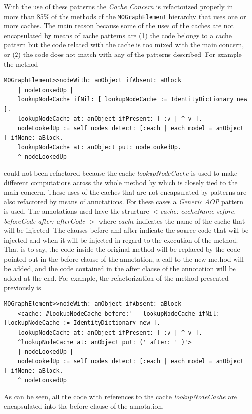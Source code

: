 \documentclass[preprint,10pt]{sigplanconf}
\newcommand{\ct}{\lstinline[backgroundcolor=\color{white},basicstyle=\footnotesize\ttfamily]}
\begin{document}
With the use of these patterns the \emph{Cache Concern} is refactorized
properly in more than 85\% of the methods of the \ct{MOGraphElement} hierarchy that uses one or more caches.
The main reason because some of the uses of the caches are not encapsulated by means of 
cache patterns are (1) the code belongs to a cache pattern but the code related with the cache is too mixed 
with the main concern, or (2) the code does not match with any of the patterns described. For example the method
\begin{lstlisting} 
MOGraphElement>>nodeWith: anObject ifAbsent: aBlock  
	| nodeLookedUp |
	lookupNodeCache ifNil: [ lookupNodeCache := IdentityDictionary new ].
	lookupNodeCache at: anObject ifPresent: [ :v | ^ v ].
	nodeLookedUp := self nodes detect: [:each | each model = anObject ] ifNone: aBlock.
	lookupNodeCache at: anObject put: nodeLookedUp.
	^ nodeLookedUp
\end{lstlisting}
could not been refactored because the cache \emph{lookupNodeCache} is used to make different computations across the whole
method by which is closely tied to the main concern. 
These uses of the caches that are not encapsulated
by patterns are also refactored by means of annotations. For these cases
a \emph{Generic AOP} pattern is used. The annotations used have the structure
\emph{$<$cache: cacheName before: beforeCode after: afterCode $>$} where \emph{cache}
indicates the name of the cache that will be injected. The clauses
before and after indicate the source code that will be injected and
when it will be injected in regard to the execution of the method.
That is to say, the code inside the original method will be replaced
by the code pointed out in the before clause of the annotation, a call
to the new method will be added, and the code contained in the after
clause of the annotation will be added at the end. For example, the refactorization of the method presented previously is
\begin{lstlisting} 
MOGraphElement>>nodeWith: anObject ifAbsent: aBlock  
	<cache: #lookupNodeCache before:'	lookupNodeCache ifNil: [lookupNodeCache := IdentityDictionary new ]. 			
	lookupNodeCache at: anObject ifPresent: [ :v | ^ v ]. 
	^lookupNodeCache at: anObject put: (' after: ' )'>
	| nodeLookedUp |
	nodeLookedUp := self nodes detect: [:each | each model = anObject ] ifNone: aBlock.
	^ nodeLookedUp
\end{lstlisting}
As can be seen, all the code with references to the cache  \emph{lookupNodeCache} are encapsulated into the before clause of the annotation.
\end{document}
